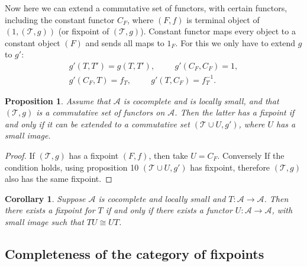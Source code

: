 \documentclass[12pt]{article}
\newcounter{the}
\newtheorem{proposition}[the]{Proposition}
\newtheorem{corollary}[the]{Corollary}
\begin{document}
Now here we can extend a commutative set of functors, with certain functors, including the constant functor $C_F$, where $(F, f)$ is terminal object of $(1, (\mathscr T, g))$ (or fixpoint of $(\mathscr T, g)$). Constant functor maps every object to a constant object $(F)$ and sends all maps to $1_F$. For this we only have to extend $g$ to $g'$:
\begin{gather*}
    g'(T, T') = g(T, T'), \hspace{1cm}    g'(C_F, C_F) = 1, \\
    g'(C_F, T) = f_T, \hspace{1cm}
    g'(T, C_F) = f_T^{-1}.
\end{gather*}

\begin{proposition}
    Assume that $\mathscr A$ is cocomplete and is locally small, and that $(\mathscr T, g)$ is a commutative set of functors on $\mathscr A$. Then the latter has a fixpoint if and only if it can be extended to a commutative set $(\mathscr T \cup U, g')$, where $U$ has a small image.
\end{proposition}
\begin{proof}
    If $(\mathscr T, g)$ has a fixpoint $(F, f)$, then take $U = C_F$. Conversely If the condition holds, using proposition 10 $(\mathscr T \cup U, g')$ has fixpoint, therefore $(\mathscr T, g)$ also has the same fixpoint.
\end{proof}

\begin{corollary}
    Suppose $\mathscr A$ is cocomplete and locally small and $T: \mathscr A \to \mathscr A$. Then there exists a fixpoint for $T$ if and only if there exists a functor $U: \mathscr A \to \mathscr A$, with small image such that $TU \cong UT$. 
\end{corollary}


\subsection*{Completeness of the category of fixpoints}
\end{document}
